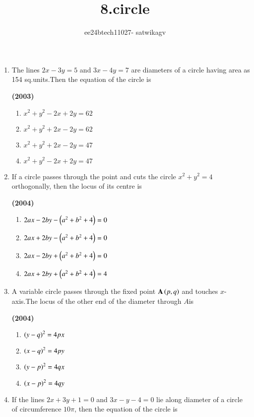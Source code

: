 \documentclass[journal,12pt,twocolumn]{IEEEtran}
\theoremstyle{remark}
\begin{document}

\vspace{3cm}

\title{8.circle}
\author{ee24btech11027- satwikagv}
\maketitle
\newpage
\bigskip

\renewcommand{\thefigure}{\theenumi}
\renewcommand{\thetable}{\theenumi}
 
\begin{enumerate}[start=6]
\item The lines $2x-3y=5$ and $3x-4y=7$ are diameters of a circle having area as 154 sq.units.Then the equation of the circle is

\hfill{\textbf{(2003)}}

\begin{enumerate}[label=(\alph*)]
\item $x^2+y^2-2x+2y=62$
\item $x^2+y^2+2x-2y=62$
\item $x^2+y^2+2x-2y=47$
\item $x^2+y^2-2x+2y=47$
\end{enumerate}
\item If a circle passes through the point  and cuts the circle $x^2+y^2=4$ orthogonally, then the locus of its centre is

\hfill{\textbf{(2004)}}

\begin{enumerate}[label=(\alph*)]
\item $2ax-2by-\left(a^2+b^2+4\right)=0$
\item $2ax+2by-\left(a^2+b^2+4\right)=0$
\item $2ax-2by+\left(a^2+b^2+4\right)=0$
\item $2ax+2by+\left(a^2+b^2+4\right)=4$
\end{enumerate}
\item A variable circle passes through the fixed point $\mathbf{A}\left(p,q\right)$ and touches $x$-axis.The locus of the other end of the diameter through $A$is

\hfill{\textbf{(2004)}}

\begin{multicols}{2}
\begin{enumerate}[label=(\alph*)]
\item $\left(y-q\right)^2=4px$
\item $\left(x-q\right)^2=4py$ 
\item $\left(y-p\right)^2=4qx$
\item $\left(x-p\right)^2=4qy$
\end{enumerate}
\end{multicols}
\item If the lines $2x+3y+1=0$ and $3x-y-4=0$ lie along diameter of a circle of circumference $10\pi$, then the equation of the circle is 


\end{enumerate}
\end{document}
